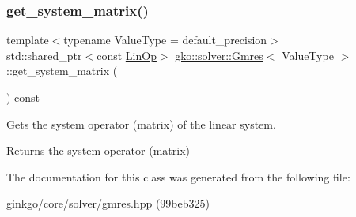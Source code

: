 \mbox{\label{classgko_1_1solver_1_1Gmres_a31d5c0225dbed72e52ea252dd38868f2}} 
\subsubsection{\texorpdfstring{get\+\_\+system\+\_\+matrix()}{get\_system\_matrix()}}
{\footnotesize\ttfamily template$<$typename Value\+Type  = default\+\_\+precision$>$ \\
std\+::shared\+\_\+ptr$<$const \hyperlink{classgko_1_1LinOp}{Lin\+Op}$>$ \hyperlink{classgko_1_1solver_1_1Gmres}{gko\+::solver\+::\+Gmres}$<$ Value\+Type $>$\+::get\+\_\+system\+\_\+matrix (\begin{DoxyParamCaption}{ }\end{DoxyParamCaption}) const}



Gets the system operator (matrix) of the linear system. 

\begin{DoxyReturn}{Returns}
the system operator (matrix) 
\end{DoxyReturn}


The documentation for this class was generated from the following file\+:\begin{DoxyCompactItemize}
\item 
ginkgo/core/solver/gmres.\+hpp (99beb325)\end{DoxyCompactItemize}
